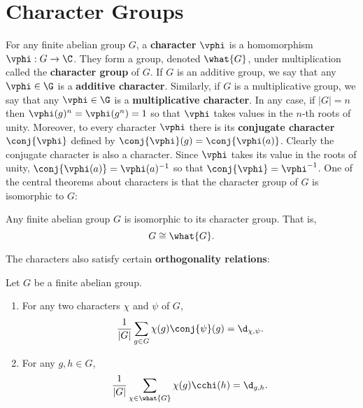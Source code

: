   \section{Character Groups}\label{append:Character_Groups}
    For any finite abelian group $G$, a \textbf{character} $\vphi$ is a homomorphism $\vphi:G \to \C$. They form a group, denoted $\what{G}$, under multiplication called the \textbf{character group} of $G$. If $G$ is an additive group, we say that any $\vphi \in \G$ is a \textbf{additive character}. Similarly, if $G$ is a multiplicative group, we say that any $\vphi \in \G$ is a \textbf{multiplicative character}. In any case, if $|G| = n$ then $\vphi(g)^{n} = \vphi(g^{n}) = 1$ so that $\vphi$ takes values in the $n$-th roots of unity. Moreover, to every character $\vphi$ there is its \textbf{conjugate character} $\conj{\vphi}$ defined by $\conj{\vphi}(g) = \conj{\vphi(a)}$. Clearly the conjugate character is also a character. Since $\vphi$ takes its value in the roots of unity, $\conj{\vphi(a)} = \vphi(a)^{-1}$ so that $\conj{\vphi} = \vphi^{-1}$. One of the central theorems about characters is that the character group of $G$ is isomorphic to $G$:

    \begin{proposition}\label{prop:character_group_isomorphim}
      Any finite abelian group $G$ is isomorphic to its character group. That is,
      \[
        G \cong \what{G}.
      \]
    \end{proposition}

    The characters also satisfy certain \textbf{orthogonality relations}:

    \begin{proposition}
      Let $G$ be a finite abelian group.
      \begin{enumerate}[label=(\roman*)]
        \item For any two characters $\chi$ and $\psi$ of $G$,
        \[
          \frac{1}{|G|}\sum_{g \in G}\chi(g)\conj{\psi}(g) = \d_{\chi,\psi}.
        \]
        \item For any $g,h \in G$,
        \[
          \frac{1}{|G|}\sum_{\chi \in \what{G}}\chi(g)\cchi(h) = \d_{g,h}.
        \]
      \end{enumerate}
    \end{proposition}
